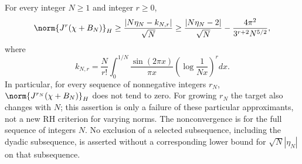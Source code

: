 \begin{proposition}
\label{prop:ns62-smoothed-obstruction}
For every integer $N\geq1$ and integer $r\geq0$,
\begin{equation}
 \norm{J^r(\chi+B_N)}_H
 \geq\frac{|N\eta_N-k_{N,r}|}{\sqrt N}
 \geq\frac{|N\eta_N-2|}{\sqrt N}
            -\frac{4\pi^2}{3^{r+2}N^{5/2}},
 \label{eq:ns62-laguerre-lower}
\end{equation}
where
\[
 k_{N,r}=\frac N{r!}\int_0^{1/N}
       \frac{\sin(2\pi x)}{\pi x}
                    \left(\log\frac1{Nx}\right)^r dx.
\]
In particular, for every sequence of nonnegative integers $r_N$,
$\norm{J^{r_N}(\chi+B_N)}_H$ does not tend to zero.
For growing $r_N$ the target also changes with $N$; this assertion
is only a failure of these particular approximants, not a new RH
criterion for varying norms.
The nonconvergence is for the full sequence of integers $N$. No
exclusion of a selected subsequence, including the dyadic subsequence,
is asserted without a corresponding lower bound for $\sqrt N|\eta_N|$
on that subsequence.
\end{proposition}
